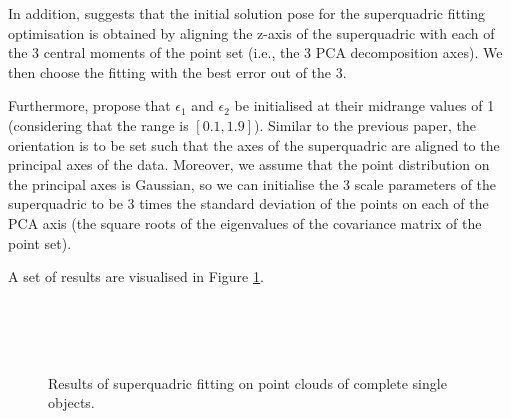 \documentclass{article}
\begin{document}
In addition, \cite{conf/icra/BiegelbauerV07} suggests that the initial solution pose for the superquadric fitting optimisation is obtained by aligning the z-axis of the superquadric with each of the 3 central moments of the point set (i.e., the 3 PCA decomposition axes). We then choose the fitting with the best error out of the 3.

Furthermore, \cite{xiao2005building} propose that $\epsilon_1$ and $\epsilon_2$ be initialised at their midrange values of 1 (considering that the range is $[0.1, 1.9]$). Similar to the previous paper, the orientation is to be set such that the axes of the superquadric are aligned to the principal axes of the data. Moreover, we assume that the point distribution on the principal axes is Gaussian, so we can initialise the 3 scale parameters of the superquadric to be 3 times the standard deviation of the points on each of the PCA axis (the square roots of the eigenvalues of the covariance matrix of the point set).

A set of results are visualised in Figure \ref{fig:fitting_results}.

\begin{figure}
\centering
{} \\
 \\
 \\

\caption {Results of superquadric fitting on point clouds of complete single objects.}
\label{fig:fitting_results}
\end{figure}
\end{document}
